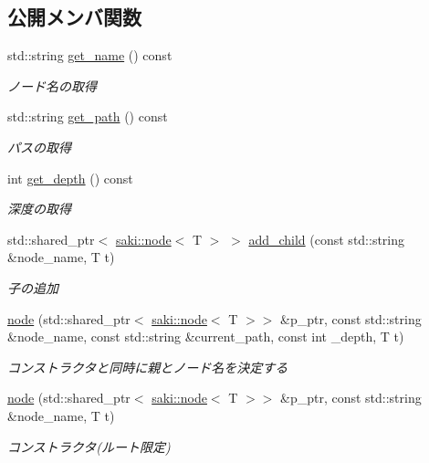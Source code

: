 \subsection*{公開メンバ関数}
\begin{DoxyCompactItemize}
\item 
std\+::string \mbox{\hyperlink{classsaki_1_1node_ac04bef91932299fe08f488de21f703b3}{get\+\_\+name}} () const
\begin{DoxyCompactList}\small\item\em ノード名の取得 \end{DoxyCompactList}\item 
std\+::string \mbox{\hyperlink{classsaki_1_1node_a9066f322842144c7d8acc3165c3130a7}{get\+\_\+path}} () const
\begin{DoxyCompactList}\small\item\em パスの取得 \end{DoxyCompactList}\item 
int \mbox{\hyperlink{classsaki_1_1node_a9ca34dd5d8d628bc814ee5dbfbafc75b}{get\+\_\+depth}} () const
\begin{DoxyCompactList}\small\item\em 深度の取得 \end{DoxyCompactList}\item 
std\+::shared\+\_\+ptr$<$ \mbox{\hyperlink{classsaki_1_1node}{saki\+::node}}$<$ T $>$ $>$ \mbox{\hyperlink{classsaki_1_1node_a5036d5107227cf9355a2576918e7fdbd}{add\+\_\+child}} (const std\+::string \&node\+\_\+name, T t)
\begin{DoxyCompactList}\small\item\em 子の追加 \end{DoxyCompactList}\item 
\mbox{\hyperlink{classsaki_1_1node_aa974c19a3a8e927d926772320029629d}{node}} (std\+::shared\+\_\+ptr$<$ \mbox{\hyperlink{classsaki_1_1node}{saki\+::node}}$<$ T $>$$>$ \&p\+\_\+ptr, const std\+::string \&node\+\_\+name, const std\+::string \&current\+\_\+path, const int \+\_\+depth, T t)
\begin{DoxyCompactList}\small\item\em コンストラクタと同時に親とノード名を決定する \end{DoxyCompactList}\item 
\mbox{\hyperlink{classsaki_1_1node_aedc85c7bcb5c34ba99093683614cd661}{node}} (std\+::shared\+\_\+ptr$<$ \mbox{\hyperlink{classsaki_1_1node}{saki\+::node}}$<$ T $>$$>$ \&p\+\_\+ptr, const std\+::string \&node\+\_\+name, T t)
\begin{DoxyCompactList}\small\item\em コンストラクタ(ルート限定) \end{DoxyCompactList}\item 

\end{DoxyCompactItemize}
